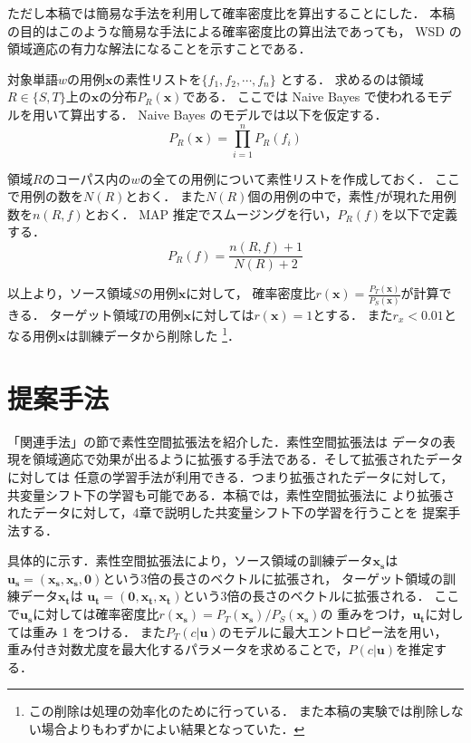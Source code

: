 \documentclass[japanese]{jnlp_1.4}
\begin{document}
ただし本稿では簡易な手法を利用して確率密度比を算出することにした．
本稿の目的はこのような簡易な手法による確率密度比の算出法であっても，
WSD の領域適応の有力な解法になることを示すことである．

対象単語\( w \)の用例\( \boldsymbol{x} \)の素性リストを\( \{ f_1,f_2,\cdots, f_n \} \) とする．
求めるのは領域\( R \in \{S, T\} \)上の\( \boldsymbol{x} \)の分布\( P_R (\boldsymbol{x}) \)である．
ここでは Naive Bayes で使われるモデルを用いて算出する．
Naive Bayes のモデルでは以下を仮定する．
\[
P_R (\boldsymbol{x}) = \prod_{i=1}^{n} P_R (f_i) 
\]

領域\( R \)のコーパス内の\( w \)の全ての用例について素性リストを作成しておく．
ここで用例の数を\( N(R) \)とおく．
また\( N(R) \)個の用例の中で，素性\( f \)が現れた用例数を\( n(R,f) \)とおく．
MAP 推定でスムージングを行い，\( P_R (f) \)を以下で定義する\cite{takamura}．
\[
P_R (f) = \frac{n(R,f) + 1}{N(R) + 2}
\]

以上より，ソース領域\( S \)の用例\(\boldsymbol{x}\)に対して，
確率密度比\( r(\boldsymbol{x}) = \frac{P_T (\boldsymbol{x})}{P_S (\boldsymbol{x})} \)が計算できる．
ターゲット領域\( T \)の用例\(\boldsymbol{x}\)に対しては\( r(\boldsymbol{x}) = 1 \)とする．
また\( r_x < 0.01 \)となる用例\(\boldsymbol{x}\)は訓練データから削除した
\footnote{この削除は処理の効率化のために行っている．
また本稿の実験では削除しない場合よりもわずかによい結果となっていた．}．



\section{提案手法}


「関連手法」の節で素性空間拡張法を紹介した．素性空間拡張法は
データの表現を領域適応で効果が出るように拡張する手法である．そして拡張されたデータに対しては
任意の学習手法が利用できる．つまり拡張されたデータに対して，
共変量シフト下の学習も可能である．本稿では，素性空間拡張法に
より拡張されたデータに対して，4章で説明した共変量シフト下の学習を行うことを
提案手法する．

具体的に示す．素性空間拡張法により，ソース領域の訓練データ\( \boldsymbol{x_s} \)は
\( \boldsymbol{u_s} = (\boldsymbol{x_s},\boldsymbol{x_s},\boldsymbol{0}) \)という3倍の長さのベクトルに拡張され，
ターゲット領域の訓練データ\( \boldsymbol{x_t} \)は
\( \boldsymbol{u_t} = (\boldsymbol{0},\boldsymbol{x_t},\boldsymbol{x_t}) \)という3倍の長さのベクトルに拡張される．
ここで\( \boldsymbol{u_s} \)に対しては確率密度比\( r(\boldsymbol{x_s}) = P_T(\boldsymbol{x_s})/P_S(\boldsymbol{x_s}) \)の
重みをつけ，\( \boldsymbol{u_t} \)に対しては重み 1 をつける．
また\( P_T(c|\boldsymbol{u}) \)のモデルに最大エントロピー法を用い，
重み付き対数尤度を最大化するパラメータを求めることで，\( P(c|\boldsymbol{u}) \)を推定する．
\end{document}

